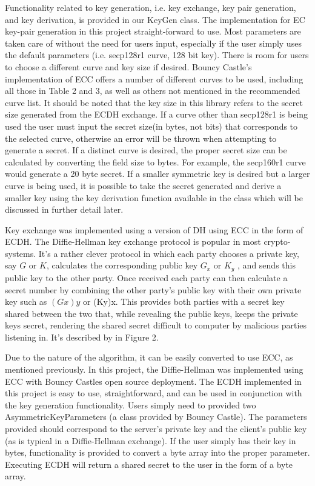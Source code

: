 Functionality related to key generation, i.e. key exchange, key pair generation, and key derivation, is provided in our KeyGen class. The implementation for EC key-pair generation in this project straight-forward to use. Most parameters are taken care of without the need for users input, especially if the user simply uses the default parameters (i.e. secp128r1 curve, 128 bit key). There is room for users to choose a different curve and key size if desired. Bouncy Castle's implementation of ECC offers a number of different curves to be used, including all those in Table 2 and 3, as well as others not mentioned in the recommended curve list. It should be noted that the key size in this library refers to the secret size generated from the ECDH exchange. If a curve other than secp128r1 is being used the user must input the secret size(in bytes, not bits) that corresponds to the selected curve, otherwise an error will be thrown when attempting to generate a secret. If a distinct curve is desired, the proper secret size can be calculated by converting the field size to bytes. For example, the secp160r1 curve would generate a 20 byte secret.  If a smaller symmetric key is desired but a larger curve is being used, it is possible to take the secret generated and derive a smaller key using the key derivation function available in the class which will be discussed in further detail later.

Key exchange was implemented using a version of DH using ECC in the form of ECDH. The Diffie-Hellman key exchange protocol is popular in most crypto-systems. It's a rather clever protocol in which each party chooses a private key, say $G$ or $K$, calculates the corresponding public key $G_x$  or $K_y$ , and sends this public key to the other party. Once received each party can then calculate a secret number by combining the other party's public key with their own private key such as $(Gx)y$ or (Ky)x. This provides both parties with a secret key shared between the two that, while revealing the public keys, keeps the private keys secret, rendering the shared secret difficult to computer by malicious parties listening in. It's described by in Figure 2. 

Due to the nature of the algorithm, it can be easily converted to use ECC, as mentioned previously. In this project, the Diffie-Hellman was implemented using ECC with Bouncy Castles open source deployment. The ECDH  implemented in this project is easy to use, straightforward, and can be used in conjunction with the key generation functionality. Users simply need to provided two AsymmetricKeyParameters (a class provided by Bouncy Castle). The parameters provided should correspond to the server's private key and the client's public key (as is typical in a Diffie-Hellman exchange). If the user simply has their key in bytes, functionality is provided to convert a byte array into the proper parameter. Executing ECDH will return a shared secret to the user in the form of a byte array.


